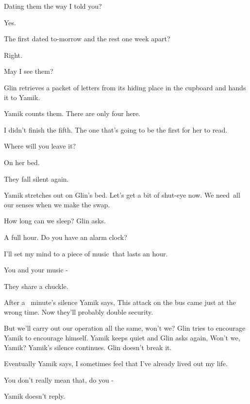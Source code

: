 \documentclass[letterpaper]{article}
\begin{document}
{\textquotedbl}Dating them the way I told you?{\textquotedbl} 

{\textquotedbl}Yes.{\textquotedbl} 

{\textquotedbl}The first dated to-morrow and the rest one week apart?{\textquotedbl} 

{\textquotedbl}Right.{\textquotedbl} 

{\textquotedbl}May I see them?{\textquotedbl} 

Glin retrieves a packet of letters from its hiding place in the cupboard and hands it to Yamik. 

Yamik counts them. {\textquotedbl}There are only four here.{\textquotedbl} 

{\textquotedbl}I didn't finish the fifth. The one that's going to be the first for her to read.{\textquotedbl} 

{\textquotedbl}Where will you leave it?{\textquotedbl} 

{\textquotedbl}On her bed.{\textquotedbl}

They fall silent again.

Yamik stretches out on Glin's bed. {\textquotedbl}Let's get a bit of shut-eye now. We need~all our senses when we make
the swap.{\textquotedbl} 

{\textquotedbl}How long can we sleep?{\textquotedbl} Glin asks. 

{\textquotedbl}A full hour. Do you have an alarm clock?{\textquotedbl} 

{\textquotedbl}I'll set my mind to a piece of music~that lasts an hour.{\textquotedbl} 

{\textquotedbl}You and your music -{\textquotedbl}

They share a chuckle. 

After a \ minute's silence Yamik says, {\textquotedbl}This attack on the bus came just at the wrong time. Now they'll
probably double security.{\textquotedbl} 

{\textquotedbl}But we'll carry out our operation all the same, won't we?{\textquotedbl} Glin tries to encourage Yamik to
encourage himself. Yamik keeps quiet and Glin asks again, {\textquotedbl}Won't we, Yamik?{\textquotedbl} Yamik's
silence continues. Glin doesn't break it.

Eventually Yamik says, {\textquotedbl}I sometimes feel that I've already lived out my life.{\textquotedbl} 

{\textquotedbl}You don't really mean that, do you -{\textquotedbl}

Yamik doesn't reply.
\end{document}
